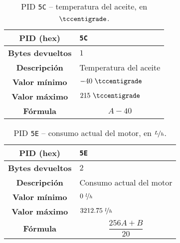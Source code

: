\begin{table}[H]
  \centering
  \begin{tabularx}{\textwidth}{|c|X|}
    \hline
    \textbf{PID (hex)}       & \texttt{5C}            \\
    \hline
    \textbf{Bytes devueltos} & $1$                    \\
    \hline
    \textbf{Descripción}     & Temperatura del aceite \\
    \hline
    \textbf{Valor mínimo}    & $-40~\tccentigrade$    \\
    \hline
    \textbf{Valor máximo}    & $215~\tccentigrade$    \\
    \hline
    \textbf{Fórmula}         &                        %
    \begin{equation*}
      A - 40
    \end{equation*}                        \\
    \hline
  \end{tabularx}
  \caption{\ac{PID} \texttt{5C} -- temperatura del aceite, en $\tccentigrade$.}
\end{table}

\begin{table}[H]
  \centering
  \begin{tabularx}{\textwidth}{|c|X|}
    \hline
    \textbf{PID (hex)}       & \texttt{5E}               \\
    \hline
    \textbf{Bytes devueltos} & $2$                       \\
    \hline
    \textbf{Descripción}     & Consumo actual del motor  \\
    \hline
    \textbf{Valor mínimo}    & $0~\nicefrac{l}{h}$       \\
    \hline
    \textbf{Valor máximo}    & $3212.75~\nicefrac{l}{h}$ \\
    \hline
    \textbf{Fórmula}         &                           %
    \begin{equation*}
      \frac{256A + B}{20}
    \end{equation*}                           \\
    \hline
  \end{tabularx}
  \caption{\ac{PID} \texttt{5E} -- consumo actual del motor, en $\nicefrac{L}{h}$.}
\end{table}

